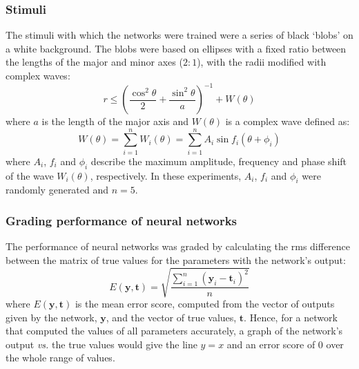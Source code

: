 \subsubsection{Stimuli}
\label{sec:methods:stimuli}
The stimuli with which the networks were trained were a series of black `blobs' on a white background.
The blobs were based on ellipses with a fixed ratio between the lengths of the major and minor axes ($2:1$), with the radii modified with complex waves:
$$
r \le \left(\frac{\cos^2 \theta}{2} + \frac{\sin^2 \theta}{a} \right)^{-1} + W(\theta)
$$
where $a$ is the length of the major axis and $W(\theta)$ is a complex wave defined as:
$$
W(\theta) = \sum_{i=1}^n W_i(\theta) = \sum_{i=1}^n A_i \sin f_i (\theta+\phi_i) 
$$
where $A_i$, $f_i$ and $\phi_i$ describe the maximum amplitude, frequency and phase shift of the wave $W_i(\theta)$, respectively.
In these experiments, $A_i$, $f_i$ and $\phi_i$ were randomly generated and $n=5$.

\subsubsection{Grading performance of neural networks}
The performance of neural networks was graded by calculating the \ac{rms} difference between the matrix of true values for the parameters with the network's output:
$$
E(\mathbf{y},\mathbf{t}) = \sqrt{\frac{\sum\limits_{i=1}^{n} (\mathbf{y}_i-\mathbf{t}_i)^2}{n}}
$$
where $E(\mathbf{y},\mathbf{t})$ is the mean error score, computed from the vector of outputs given by the network, $\mathbf{y}$, and the vector of true values, $\mathbf{t}$.
Hence, for a network that computed the values of all parameters accurately, a graph of the network's output \emph{vs.} the true values would give the line $y=x$ and an error score of 0 over the whole range of values.

